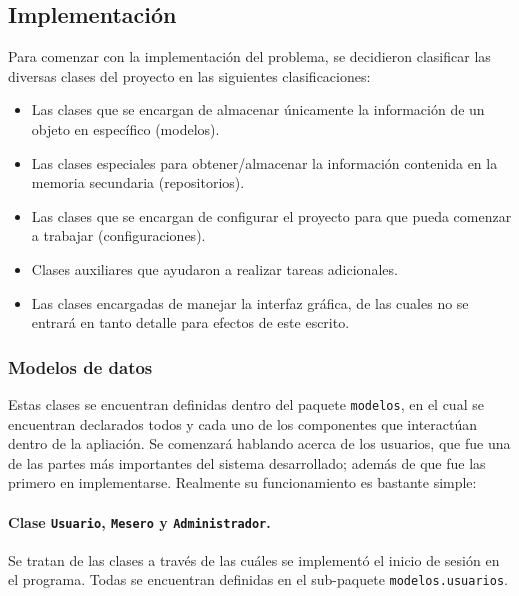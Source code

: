 \subsection*{Implementación}


Para comenzar con la implementación del problema, se decidieron clasificar las
diversas clases del proyecto en las siguientes clasificaciones:

\begin{itemize}
  \item Las clases que se encargan de almacenar únicamente la información de 
  un objeto en específico (modelos).
  \item Las clases especiales para obtener/almacenar la información contenida 
  en la memoria secundaria (repositorios).
  \item Las clases que se encargan de configurar el proyecto para que pueda 
  comenzar a trabajar (configuraciones).
  \item Clases auxiliares que ayudaron a realizar tareas adicionales.
  \item Las clases encargadas de manejar la interfaz gráfica, de las cuales no 
  se entrará en tanto detalle para efectos de este escrito.
\end{itemize}

\subsubsection*{Modelos de datos}

Estas clases se encuentran definidas dentro del paquete \texttt{modelos}, en 
el cual se encuentran declarados todos y cada uno de los componentes que 
interactúan dentro de la apliación. Se comenzará hablando acerca de los 
usuarios, que fue una de las partes más importantes del sistema desarrollado; 
además de que fue las primero en implementarse. Realmente su funcionamiento
es bastante simple:

\paragraph{Clase \texttt{Usuario}, \texttt{Mesero} y \texttt{Administrador}.} 
Se tratan de las clases a través de las cuáles se implementó el inicio de 
sesión en el programa. Todas se encuentran definidas en el sub-paquete 
\texttt{modelos.usuarios}.

